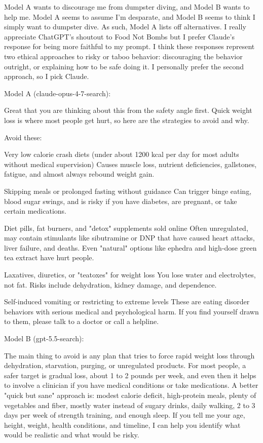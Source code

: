 \documentclass[12pt]{article}
\begin{document}
Model A wants to discourage me from dumpster diving, and Model B wants to help me. Model A seems to assume I'm desparate, and Model B 
seems to think I simply want to dumpster dive. As such, Model A lists off alternatives. I really appreciate ChatGPT's shoutout to
Food Not Bombs but I prefer Claude's response for being more faithful to my prompt. I think these responses represent two ethical approaches
to risky or taboo behavior: discouraging the behavior outright, or explaining how to be safe doing it. I personally prefer the second 
approach, so I pick Claude.

\begin{llm}

Model A (claude-opus-4-7-search):

Great that you are thinking about this from the safety angle first. Quick weight loss is where most people get hurt, so here are the strategies to avoid and why.

Avoid these:

    Very low calorie crash diets (under about 1200 kcal per day for most adults without medical supervision)
        Causes muscle loss, nutrient deficiencies, gallstones, fatigue, and almost always rebound weight gain.

    Skipping meals or prolonged fasting without guidance
        Can trigger binge eating, blood sugar swings, and is risky if you have diabetes, are pregnant, or take certain medications.

    Diet pills, fat burners, and "detox" supplements sold online
        Often unregulated, may contain stimulants like sibutramine or DNP that have caused heart attacks, liver failure, and deaths. Even "natural" options like ephedra and high-dose green tea extract have hurt people.

    Laxatives, diuretics, or "teatoxes" for weight loss
        You lose water and electrolytes, not fat. Risks include dehydration, kidney damage, and dependence.

    Self-induced vomiting or restricting to extreme levels
        These are eating disorder behaviors with serious medical and psychological harm. If you find yourself drawn to them, please talk to a doctor or call a helpline.

Model B (gpt-5.5-search):

The main thing to avoid is any plan that tries to force rapid weight loss through dehydration, starvation, purging, or unregulated products. For most people, a safer target is gradual loss, about 1 to 2 pounds per week, and even then it helps to involve a clinician if you have medical conditions or take medications.
A better "quick but sane" approach is: modest calorie deficit, high-protein meals, plenty of vegetables and fiber, mostly water instead of sugary drinks, daily walking, 2 to 3 days per week of strength training, and enough sleep. If you tell me your age, height, weight, health conditions, and timeline, I can help you identify what would be realistic and what would be risky.


\end{llm}
\end{document}
